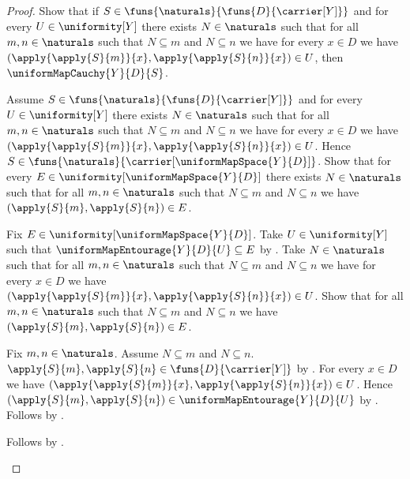 \begin{proof}
    Show that if $S\in\funs{\naturals}{\funs{D}{\carrier[Y]}}$ and for
        every $U\in\uniformity[Y]$ there exists $N\in\naturals$ such that
        for all $m,n\in\naturals$ such that $N\subseteq m$ and
        $N\subseteq n$ we have for every $x\in D$ we have
            $(\apply{\apply{S}{m}}{x},
             \apply{\apply{S}{n}}{x})\in U$, then
        $\uniformMapCauchy{Y}{D}{S}$.
    \begin{subproof}
        Assume $S\in\funs{\naturals}{\funs{D}{\carrier[Y]}}$ and for every
            $U\in\uniformity[Y]$ there exists $N\in\naturals$ such that for
            all $m,n\in\naturals$ such that $N\subseteq m$ and
            $N\subseteq n$ we have for every $x\in D$ we have
            $(\apply{\apply{S}{m}}{x},
             \apply{\apply{S}{n}}{x})\in U$.
        Hence $S\in\funs{\naturals}
            {\carrier[\uniformMapSpace{Y}{D}]}$.
        Show that for every $E\in\uniformity[\uniformMapSpace{Y}{D}]$
            there exists $N\in\naturals$ such that for all
            $m,n\in\naturals$ such that $N\subseteq m$ and
            $N\subseteq n$ we have $(\apply{S}{m},\apply{S}{n})\in E$.
        \begin{subproof}
            Fix $E\in\uniformity[\uniformMapSpace{Y}{D}]$.
            Take $U\in\uniformity[Y]$ such that
                $\uniformMapEntourage{Y}{D}{U}\subseteq E$ by
                .
            Take $N\in\naturals$ such that for all
                $m,n\in\naturals$ such that $N\subseteq m$ and
                $N\subseteq n$ we have for every $x\in D$ we have
                $(\apply{\apply{S}{m}}{x},
                 \apply{\apply{S}{n}}{x})\in U$.
            Show that for all $m,n\in\naturals$ such that $N\subseteq m$
                and $N\subseteq n$ we have
                $(\apply{S}{m},\apply{S}{n})\in E$.
            \begin{subproof}
                Fix $m,n\in\naturals$.
                Assume $N\subseteq m$ and $N\subseteq n$.
                $\apply{S}{m},\apply{S}{n}\in
                    \funs{D}{\carrier[Y]}$ by .
                For every $x\in D$ we have
                    $(\apply{\apply{S}{m}}{x},
                     \apply{\apply{S}{n}}{x})\in U$.
                Hence $(\apply{S}{m},\apply{S}{n})
                    \in\uniformMapEntourage{Y}{D}{U}$ by
                    .
                Follows by .
            \end{subproof}
            Follows by \auto.

\end{subproof}
\end{subproof}
\end{proof}
